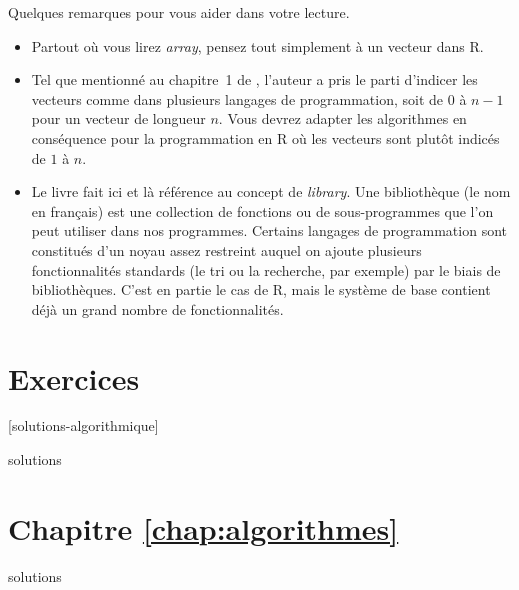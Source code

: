 Quelques remarques pour vous aider dans votre lecture.
\begin{itemize}
\item Partout où vous lirez \emph{array}, pensez tout simplement à un
  vecteur dans R.
\item Tel que mentionné au chapitre~1 de
  \citet{Stephens:algorithms:2013}, l'auteur a pris le parti d'indicer
  les vecteurs comme dans plusieurs langages de programmation, soit de
  $0$ à $n - 1$ pour un vecteur de longueur $n$. Vous devrez adapter
  les algorithmes en conséquence pour la programmation en R où les
  vecteurs sont plutôt indicés de $1$ à $n$.
\item Le livre fait ici et là référence au concept de \emph{library}.
  Une bibliothèque (le nom en français) est une collection de
  fonctions ou de sous-programmes que l'on peut utiliser dans nos
  programmes. Certains langages de programmation sont constitués d'un
  noyau assez restreint auquel on ajoute plusieurs fonctionnalités
  standards (le tri ou la recherche, par exemple) par le biais de
  bibliothèques. C'est en partie le cas de R, mais le système de base
  contient déjà un grand nombre de fonctionnalités.
\end{itemize}


\section{Exercices}
\label{sec:algorithmique:exercices}

[solutions-algorithmique]

\begin{Filesave}{solutions}
\section*{Chapitre \ref*{chap:algorithmes}}

\begingroup
\lstset{%
  frame=single,
  numbers=none,
  basicstyle=\normalfont\ttfamily\NoAutoSpacing}

\end{Filesave}



\begin{Filesave}{solutions}
\endgroup                               %
\end{Filesave}


